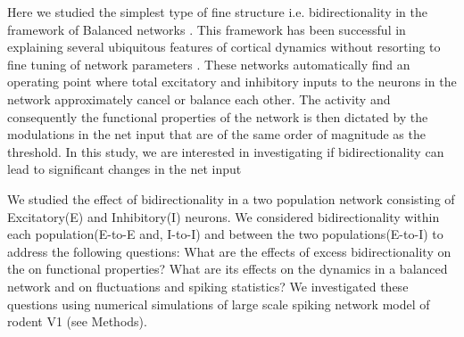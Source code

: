 Here we studied the simplest type of fine structure i.e. bidirectionality in the framework of Balanced networks \cite{carl1996, carl1998, carl2004}. This framework has been successful in explaining several ubiquitous features of cortical dynamics without resorting to fine tuning of network parameters \cite{softky1993, Holt1996, roxin2011}. These networks automatically find an operating point where total excitatory and inhibitory inputs to the neurons in the network approximately cancel or balance each other. The activity and consequently the functional properties of the network is then dictated by the modulations in the net input that are of the same order of magnitude as the threshold. In this study, we are interested in investigating if bidirectionality can lead to significant changes in the net input 


	
We studied the effect of bidirectionality in a two population network consisting of Excitatory(E) and Inhibitory(I) neurons. We considered bidirectionality within each population(E-to-E and, I-to-I) and between the two populations(E-to-I) to address the following questions: What are the effects of excess bidirectionality on the on functional properties? What are its effects on the dynamics in a balanced network and on fluctuations and spiking statistics? We investigated these questions using numerical simulations of large scale spiking network  model of rodent V1 (see Methods). \\
